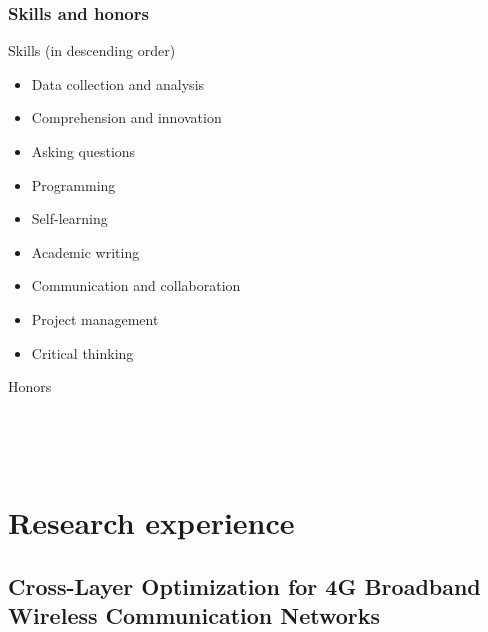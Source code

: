 \documentclass{beamer}
\begin{document}
\begin{frame}
\frametitle{Skills and honors}

\begin{block}{Skills (in descending order)}
\begin{itemize}
  \item Data collection and analysis
  \item Comprehension and innovation
  \item Asking questions
  \item Programming
  \item Self-learning
  \item Academic writing
  \item Communication and collaboration
  \item Project management
  \item Critical thinking
\end{itemize}
\end{block}

\begin{block}{Honors}
\begin{minipage}[t]{0.7\textwidth}
\end{minipage}
~
\begin{minipage}[t]{0.2\textwidth}
\end{minipage}


\begin{minipage}[t]{0.7\textwidth}
\end{minipage}
~
\begin{minipage}[t]{0.2\textwidth}
\end{minipage}

\end{block}

\end{frame}


\section{Research experience}

\subsection{Cross-Layer Optimization for 4G Broadband Wireless Communication Networks}
\end{document}
